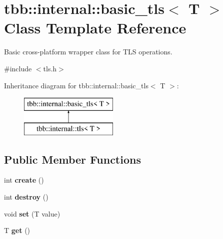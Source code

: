 \hypertarget{classtbb_1_1internal_1_1basic__tls}{}\section{tbb\+:\+:internal\+:\+:basic\+\_\+tls$<$ T $>$ Class Template Reference}
\label{classtbb_1_1internal_1_1basic__tls}


Basic cross-\/platform wrapper class for T\+L\+S operations.  




{\ttfamily \#include $<$tls.\+h$>$}

Inheritance diagram for tbb\+:\+:internal\+:\+:basic\+\_\+tls$<$ T $>$\+:\begin{figure}[H]
\begin{center}
\leavevmode
\includegraphics[height=2.000000cm]{classtbb_1_1internal_1_1basic__tls}
\end{center}
\end{figure}
\subsection*{Public Member Functions}
\begin{DoxyCompactItemize}
\item 
\hypertarget{classtbb_1_1internal_1_1basic__tls_ac9a0e46d8b7f2bebfa8c76cf029d531c}{}int {\bfseries create} ()\label{classtbb_1_1internal_1_1basic__tls_ac9a0e46d8b7f2bebfa8c76cf029d531c}

\item 
\hypertarget{classtbb_1_1internal_1_1basic__tls_a9984a1875a97676a751467ad3624b306}{}int {\bfseries destroy} ()\label{classtbb_1_1internal_1_1basic__tls_a9984a1875a97676a751467ad3624b306}

\item 
\hypertarget{classtbb_1_1internal_1_1basic__tls_a3f44ef58deff047e6040e7082a9d6506}{}void {\bfseries set} (T value)\label{classtbb_1_1internal_1_1basic__tls_a3f44ef58deff047e6040e7082a9d6506}

\item 
\hypertarget{classtbb_1_1internal_1_1basic__tls_a636ef4cc45424603061a811110622a4b}{}T {\bfseries get} ()\label{classtbb_1_1internal_1_1basic__tls_a636ef4cc45424603061a811110622a4b}

\end{DoxyCompactItemize}


